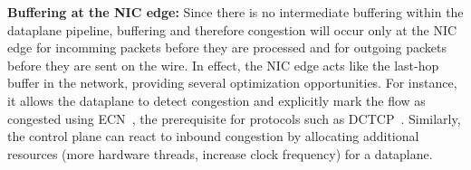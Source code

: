 {\bf Buffering at the NIC edge:} Since there is no intermediate
buffering within the dataplane pipeline, buffering and therefore
congestion will occur only at the NIC edge for incomming packets
before they are processed and for outgoing packets before they are
sent on the wire.  In effect, the NIC edge acts like the last-hop
buffer in the network, providing several optimization
opportunities. For instance, it allows the dataplane to detect
congestion and explicitly mark the flow as congested using
ECN~\cite{ramakrishnan2001addition}, the prerequisite for protocols
such as DCTCP~\cite{DBLP:conf/sigcomm/AlizadehGMPPPSS10}. Similarly,
the control plane can react to inbound congestion by allocating
additional resources (more hardware threads, increase clock frequency)
for a dataplane.
